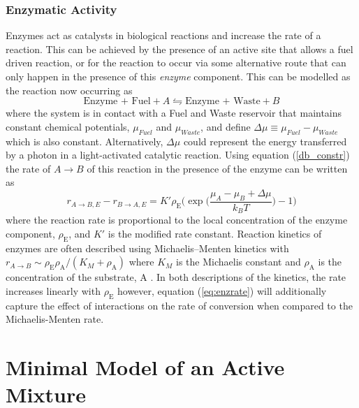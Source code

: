 \subsubsection{Enzymatic Activity}
Enzymes act as catalysts in biological reactions and increase the rate of a reaction. This can be achieved by the presence of an active site that allows a fuel driven reaction, or for the reaction to occur via some alternative route that can only happen in the presence of this \textit{enzyme} component. This can be modelled as the reaction now occurring as
\begin{equation}
    \text{Enzyme + Fuel} + A \leftrightharpoons \text{Enzyme + Waste} + B
\end{equation}
where the system is in contact with a Fuel and Waste reservoir that maintains constant chemical potentials, $\mu_{Fuel}$ and $\mu_{Waste}$, and define $\Delta\mu \equiv \mu_{Fuel}-\mu_{Waste}$ which is also constant. Alternatively, $\Delta \mu$ could represent the energy transferred by a photon in a light-activated catalytic reaction. Using equation (\ref{db_constr}) the rate of $A \rightarrow B$ of this reaction in the presence of the enzyme can be written as
\begin{equation}
    r_{A \rightarrow B,E} - r_{B \rightarrow A,E} = K'\rho_\textrm{E}\Bigg(\exp\bigg(\frac{\mu_A - \mu_B + \Delta\mu}{k_B T}\bigg)-1\Bigg)
    \label{eq:enzrate}
\end{equation}
where the reaction rate is proportional to the local concentration of the enzyme component, $\rho_\textrm{E}$, and $K'$ is the modified rate constant. Reaction kinetics of enzymes are often described using Michaelis–Menten kinetics with $r_{A\rightarrow B}\sim\rho_\textrm{E}\rho_\textrm{A}/(K_{M}+\rho_\textrm{A})$ where $K_M$ is the Michaelis constant and $\rho_\textrm{A}$ is the concentration of the substrate, A \cite{murray_mathematical_1993}. In both  descriptions of the kinetics, the rate increases linearly with $\rho_\textrm{E}$ however, equation (\ref{eq:enzrate}) will additionally capture the effect of interactions on the rate of conversion when compared to the Michaelis-Menten rate.

\section{Minimal Model of an Active Mixture}

